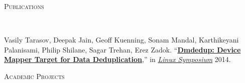 \documentclass[11pt]{article}
\newenvironment{changemargin}[2]{%
  \begin{list}{}{%
    \setlength{\topsep}{0pt}%
    \setlength{\leftmargin}{#1}%
    \setlength{\rightmargin}{#2}%
    \setlength{\listparindent}{\parindent}%
    \setlength{\itemindent}{\parindent}%
    \setlength{\parsep}{\parskip}%
  }%
  \item[]}{\end{list}
}
\newcommand{\lineover}{
	\begin{changemargin}{-0.05in}{-0.05in}
		\vspace*{-8pt}
		\hrulefill \\
		\vspace*{-2pt}
	\end{changemargin}
}
\newcommand{\header}[1]{
	\begin{changemargin}{-0.5in}{-0.5in}
		\scshape{#1}\\
  	\lineover
	\end{changemargin}
}
\newenvironment{body} {
	\vspace*{-16pt}
	\begin{changemargin}{-0.25in}{-0.5in}
  }	
	{\end{changemargin}
}
\begin{document}
\smallskip

\header{Publications}

\begin{body}
	\vspace{14pt}
	Vasily Tarasov, Deepak Jain, Geoff Kuenning, Sonam Mandal, Karthikeyani Palanisami, Philip Shilane, Sagar Trehan, Erez Zadok. ``\href{http://www.fsl.cs.sunysb.edu/docs/ols-dmdedup/dmdedup-ols14.pdf}{\textbf{Dmdedup: Device Mapper Target for Data Deduplication}},'' in \href{http://www.linuxsymposium.org/2014/}{\emph{Linux Symposium}} 2014.\\
	\smallskip
\end{body}

\smallskip

\header{Academic Projects}
\end{document}
